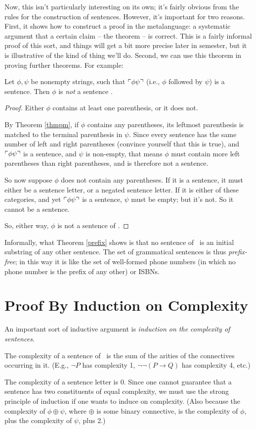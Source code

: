Now, this isn't particularly interesting on its own; it's fairly obvious from the rules for the construction of sentences. However, it's important for two reasons. First, it shows how to construct a proof in the metalanguage: a systematic argument that a certain claim – the theorem – is correct. This is a fairly informal proof of this sort, and things will get a bit more precise later in semester, but it is illustrative of the kind of thing we'll do. Second, we can use this theorem in proving further theorems. For example: \begin{theorem}\label{prefix} Let $\phi,\psi$ be nonempty strings, such that $\ulcorner \phi\psi \urcorner$ (i.e., $\phi$ followed by $\psi$) is a sentence. Then $\phi$ is \emph{not} a sentence \citep[\S 2, Theorem 5]{sep-logic-classical}.
  	\begin{proof} Either $\phi$ contains at least one parenthesis, or it does not.

  		By Theorem \ref{thmpm}, if $\phi$ contains any parentheses, its leftmost parenthesis is matched to the terminal parenthesis in $\psi$. Since every sentence has the same number of left and right parentheses (convince yourself that this is true), and $\ulcorner \phi\psi \urcorner$ is a sentence, and $\psi$ is non-empty, that means $\phi$ must contain more left parentheses than right parentheses, and is therefore not a sentence. 

  		So now suppose $\phi$ does not contain any parentheses. If it is a sentence, it must either be a sentence letter, or a negated sentence letter. If it is either of these categories, and yet $\ulcorner \phi\psi \urcorner$ is a sentence, $\psi$ must be empty; but it's not. So it cannot be a sentence.

  		So, either way, $\phi$ is not a sentence of \lone. 
  	\end{proof}
  \end{theorem}
Informally, what Theorem \ref{prefix} shows is that no sentence of \lone\ is an initial substring of any other sentence. The set of grammatical sentences is thus \emph{prefix-free}; in this way it is like the set of well-formed phone numbers (in which no phone number is the prefix of any other) or ISBNs.

\section{Proof By Induction on Complexity}

An important sort of inductive argument is \emph{induction on the complexity of sentences}.
\begin{definition}[Complexity]
	The complexity of a sentence of \lone\ is the sum of the arities of the connectives occurring in it. (E.g., $\neg P$ has complexity 1, $\neg\neg(P \to Q)$ has complexity 4, etc.)
\end{definition}
The complexity of a sentence letter is 0. Since one cannot guarantee that a sentence has two constituents of equal complexity, we must use the strong principle of induction if one wants to induce on complexity. (Also because the complexity of $\phi \oplus \psi$, where $\oplus$ is some binary connective, is the complexity of $\phi$, plus the complexity of $\psi$, plus 2.) 

